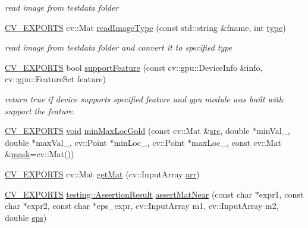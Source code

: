 \begin{DoxyCompactItemize}
\begin{DoxyCompactList}\small\item\em read image from testdata folder \end{DoxyCompactList}\item 
\hyperlink{core_2types__c_8h_a1bf9f0e121b54272da02379cfccd0a2b}{C\-V\-\_\-\-E\-X\-P\-O\-R\-T\-S} cv\-::\-Mat \hyperlink{namespacecvtest_ad051b05ec01725e6f1b8d4ab7a8752c4}{read\-Image\-Type} (const std\-::string \&fname, int \hyperlink{imgproc__c_8h_a84612d8738bf935200cf32a103d8efe1}{type})
\begin{DoxyCompactList}\small\item\em read image from testdata folder and convert it to specified type \end{DoxyCompactList}\item 
\hyperlink{core_2types__c_8h_a1bf9f0e121b54272da02379cfccd0a2b}{C\-V\-\_\-\-E\-X\-P\-O\-R\-T\-S} bool \hyperlink{namespacecvtest_a085a1265f44a20d04cce5684b11bcecc}{support\-Feature} (const cv\-::gpu\-::\-Device\-Info \&info, cv\-::gpu\-::\-Feature\-Set feature)
\begin{DoxyCompactList}\small\item\em return true if device supports specified feature and gpu module was built with support the feature. \end{DoxyCompactList}\item 
\hyperlink{core_2types__c_8h_a1bf9f0e121b54272da02379cfccd0a2b}{C\-V\-\_\-\-E\-X\-P\-O\-R\-T\-S} \hyperlink{legacy_8hpp_a8bb47f092d473522721002c86c13b94e}{void} \hyperlink{namespacecvtest_a173aef4e10da98b9e25d652fb5b9cb9c}{min\-Max\-Loc\-Gold} (const cv\-::\-Mat \&\hyperlink{legacy_8hpp_a371cd109b74033bc4366f584edd3dacc}{src}, double $\ast$min\-Val\-\_\-, double $\ast$max\-Val\-\_, cv\-::\-Point $\ast$min\-Loc\-\_, cv\-::\-Point $\ast$max\-Loc\-\_, const cv\-::\-Mat \&\hyperlink{tracking_8hpp_a6b13ecd2fd6ec7ad422f1d7863c3ad19}{mask}=cv\-::\-Mat())
\item 
\hyperlink{core_2types__c_8h_a1bf9f0e121b54272da02379cfccd0a2b}{C\-V\-\_\-\-E\-X\-P\-O\-R\-T\-S} cv\-::\-Mat \hyperlink{namespacecvtest_a013423daee12cfe7a2d35e3f50f5648b}{get\-Mat} (cv\-::\-Input\-Array \hyperlink{core__c_8h_ab8e13ef59ba6f71bb02934957ba61c65}{arr})
\item 
\hyperlink{core_2types__c_8h_a1bf9f0e121b54272da02379cfccd0a2b}{C\-V\-\_\-\-E\-X\-P\-O\-R\-T\-S} \hyperlink{classtesting_1_1AssertionResult}{testing\-::\-Assertion\-Result} \hyperlink{namespacecvtest_a62ea6d823dd154406f86d715391862e9}{assert\-Mat\-Near} (const char $\ast$expr1, const char $\ast$expr2, const char $\ast$eps\-\_\-expr, cv\-::\-Input\-Array m1, cv\-::\-Input\-Array m2, double \hyperlink{imgproc__c_8h_aabece9d4af1ab09d2f85ade473757e32}{eps})

\end{DoxyCompactItemize}
